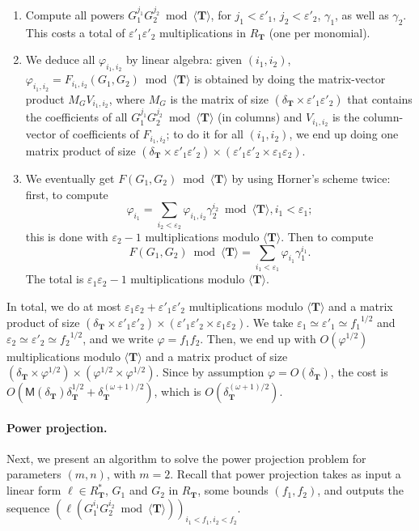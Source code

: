 \documentclass[12pt]{article}
\def\M {\ensuremath{\mathsf{M}}}
\def\Tt {\ensuremath{\mathbf{T}}}
\begin{document}
\begin{enumerate}
\item Compute all powers $G_1^{j_1} G_2^{j_2} \bmod \langle
  \Tt\rangle$, for $j_1 < \varepsilon'_1$, $j_2 < \varepsilon'_2$,
  $\gamma_1$, as well as $\gamma_2$. This costs a total of
  $\varepsilon'_1 \varepsilon'_2$ multiplications in $R_\Tt$ (one per
  monomial).
\item We deduce all $\varphi_{i_1,i_2}$ by linear algebra: given
  $(i_1,i_2)$, $\varphi_{i_1,i_2}=F_{i_1,i_2}(G_1,G_2) \bmod \langle
  \Tt\rangle$ is obtained by doing the matrix-vector product $M_G
  V_{i_1,i_2}$, where $M_G$ is the matrix of size $(\delta_\Tt \times
  \varepsilon'_1 \varepsilon'_2)$ that contains the coefficients of
  all $G_1^{j_1} G_2^{j_2} \bmod \langle \Tt \rangle$ (in columns) and
  $V_{i_1,i_2}$ is the column-vector of coefficients of $F_{i_1,i_2}$;
  to do it for all $(i_1,i_2)$, we end up doing one matrix product of
  size $(\delta_\Tt \times \varepsilon'_1 \varepsilon'_2) \times
  (\varepsilon'_1 \varepsilon'_2 \times \varepsilon_1 \varepsilon_2)$.
\item We eventually get $F(G_1,G_2) \bmod \langle \Tt \rangle$ by
  using Horner's scheme twice: first, to compute
  \[
  \varphi_{i_1} = \sum_{i_2 < \varepsilon_2} \varphi_{i_1,i_2}
  \gamma_2^{i_2} \bmod \langle \Tt \rangle, i_1 < \varepsilon_1;
  \]
  this is done with $\varepsilon_2-1$ multiplications modulo $\langle
  \Tt \rangle$. Then to compute
  \[
  F(G_1,G_2) \bmod \langle \Tt \rangle = \sum_{i_1 < \varepsilon_1}
  \varphi_{i_1} \gamma_1^{i_1}.
  \]
  The total is $\varepsilon_1 \varepsilon_2-1$ multiplications modulo
  $\langle \Tt \rangle$.
\end{enumerate}
In total, we do at most $\varepsilon_1 \varepsilon_2+\varepsilon'_1
\varepsilon'_2$ multiplications modulo $\langle \Tt \rangle$ and a
matrix product of size $(\delta_\Tt \times \varepsilon'_1
\varepsilon'_2) \times (\varepsilon'_1 \varepsilon'_2 \times
\varepsilon_1 \varepsilon_2)$.  We take $\varepsilon_1 \simeq
\varepsilon'_1 \simeq {f_1}^{1/2}$ and $\varepsilon_2 \simeq
\varepsilon'_2 \simeq {f_2}^{1/2}$, and we write $\varphi=f_1 f_2$.
Then, we end up with $O(\varphi^{1/2})$ multiplications modulo
$\langle \Tt \rangle$ and a matrix product of size $(\delta_\Tt \times
\varphi^{1/2}) \times (\varphi^{1/2} \times \varphi^{1/2})$.  Since by
assumption $\varphi=O(\delta_\Tt)$, the cost is
$O(\M(\delta_\Tt)\delta_\Tt^{1/2} + \delta_\Tt^{(\omega+1)/2})$, which
is $O(\delta_\Tt^{(\omega+1)/2})$.

\paragraph{Power projection.} 
Next, we present an algorithm to solve the power projection problem
for parameters $(m,n)$, with $m=2$. Recall that power projection takes
as input a linear form $\ell\in R_\Tt^*$, $G_1$ and $G_2$ in $R_\Tt$,
some bounds $(f_1,f_2)$, and outputs the sequence
$(\ell(G_1^{i_1}G_2^{i_2} \bmod \langle \Tt \rangle))_{i_1
  <f_1,i_2<f_2}$.
\end{document}
